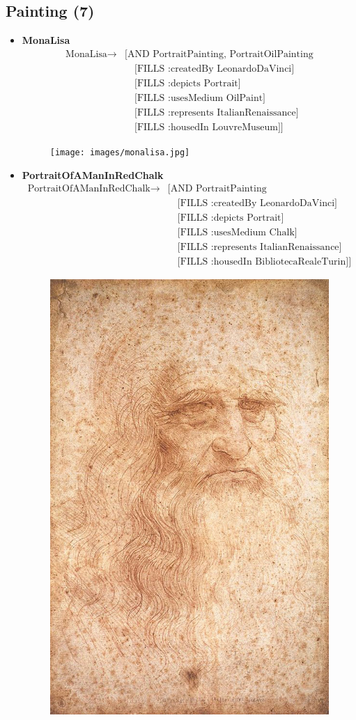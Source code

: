     \subsection{Painting (7)}
    \begin{itemize}
      \item \textbf{MonaLisa}
        \begin{align*}
          \text{MonaLisa} \to& \text{[AND PortraitPainting, PortraitOilPainting}\\
          &\quad\text{[FILLS :createdBy LeonardoDaVinci]}\\
          &\quad\text{[FILLS :depicts Portrait]}\\
          &\quad\text{[FILLS :usesMedium OilPaint]}\\
          &\quad\text{[FILLS :represents ItalianRenaissance]}\\
          &\quad\text{[FILLS :housedIn LouvreMuseum]]}
        \end{align*}
        \begin{figure}[H]
          \centering
          \texttt{[image: images/monalisa.jpg]}
        \end{figure}
      \pagebreak
      \item \textbf{PortraitOfAManInRedChalk}
        \begin{align*}
          \text{PortraitOfAManInRedChalk} \to& \text{[AND PortraitPainting}\\
          &\quad\text{[FILLS :createdBy LeonardoDaVinci]}\\
          &\quad\text{[FILLS :depicts Portrait]}\\
          &\quad\text{[FILLS :usesMedium Chalk]}\\
          &\quad\text{[FILLS :represents ItalianRenaissance]}\\
          &\quad\text{[FILLS :housedIn BibliotecaRealeTurin]]}
        \end{align*}
        \begin{figure}[H]
          \centering
          \includegraphics[width=0.35\linewidth]{images/maninredchalk.jpg}

\end{figure}
\end{itemize}
